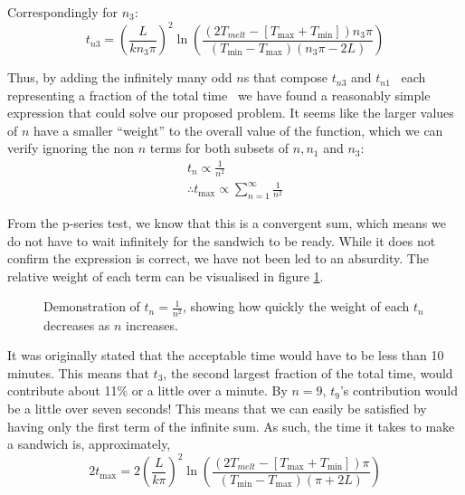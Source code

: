 Correspondingly for $n_3$:
\begin{equation*}
    t_{n3} = \left(\frac{L}{kn_3\pi}\right)^2 \ln \left( \frac{(2T_{melt} - [T_{\max} +T_{\min}])n_3\pi }{(T_{\min} - T_{\max})(n_3\pi - 2L)} \right)
\end{equation*}

Thus, by adding the infinitely many odd $n$s that compose $t_{n3}$ and $t_{n1}$ \textendash\ each representing a fraction of the total time \textendash\, we have found a reasonably simple expression that could solve our proposed problem. 
It seems like the larger values of $n$ have a smaller ``weight'' to the overall value of the function, which we can verify ignoring the non $n$ terms for both subsets of $n, n_1$ and $n_3$:
\begin{equation*}
\begin{split}
    t_{n} \propto \frac{1}{n^2} \\
    \therefore t_{\max} \propto \sum_{n=1}^{\infty} \frac{1}{n^2}
\end{split}
\end{equation*}

From the p-series test, we know that this is a convergent sum, which means we do not have to wait infinitely for the sandwich to be ready. While it does not confirm the expression is correct, we have not been led to an absurdity. The relative weight of each term can be visualised in figure \ref{gr:1/n2}.

\begin{figure}[h] \centering
{}
\caption{Demonstration of ${\displaystyle t_n=\frac{1}{n^2} }$, showing how quickly the weight of each $t_{n}$ decreases as $n$ increases.}
\label{gr:1/n2}
\end{figure}
It was originally stated that the acceptable time would have to be less than 10 minutes. 
This means that $t_{3}$, the second largest fraction of the total time, would contribute about 11\% or a little over a minute. 
By $n=9$, $t_{9}$'s contribution would be a little over seven seconds! 
This means that we can easily be satisfied by having only the first term of the infinite sum. 
As such, the time it takes to make a sandwich is, approximately,
\begin{equation}
    2t_{\max} = 2\left(\frac{L}{k\pi}\right)^2 \ln \left( \frac{(2T_{melt} - [T_{\max} +T_{\min}])\pi }{(T_{\min} - T_{\max})(\pi + 2L)} \right)
\end{equation}

